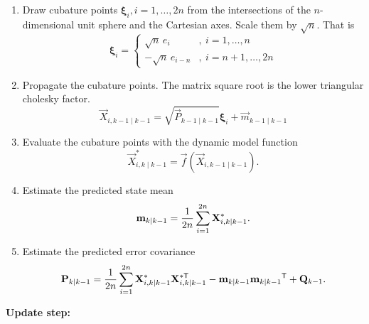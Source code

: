 \begin{enumerate}

  \item Draw cubature points $\boldsymbol{\xi}_i, i=1,\ldots,2n$ from the intersections of the $n$-dimensional unit sphere and the Cartesian axes. Scale them by $\sqrt{n}$. That is
%
    $$ \boldsymbol{\xi}_i =
	\begin{cases} 
	    \sqrt{n} \, e_i      & ,\: i = 1,\ldots,n \\
	    -\sqrt{n} \, e_{i-n} & ,\: i = n+1,\ldots,2n
	\end{cases}
 $$

  \item Propagate the cubature points. The matrix square root is the lower triangular cholesky factor.%
%
    $$ \vec{X}_{i,k-1 \mid k-1} = \sqrt{\vec{P}_{k-1 \mid k-1}} \boldsymbol{\xi}_i + \vec{m}_{k-1 \mid k-1}$$

  \item Evaluate the cubature points with the dynamic model function%
%
    $$ \vec{X}_{i,k \mid k-1}^* = \vec{f}(\vec{X}_{i,k-1 \mid k-1}). $$

  \item Estimate the predicted state mean%
%
    $$ \vec{m}_{k \mid k-1}  = {1 \over 2 n} \sum_{i=1}^{2 n} \vec{X}_{i,k \mid k-1}^*. $$

  \item Estimate the predicted error covariance%
%
    $$ \vec{P}_{k \mid k-1} = {1 \over 2 n} \sum_{i=1}^{2 n} \vec{X}_{i,k \mid k-1}^* \vec{X}_{i,k \mid k-1}^{*\mathsf{T}} - \vec{m}_{k \mid k-1} \vec{m}_{k \mid k-1}\T + \vec{Q}_{k-1}.$$ 

\end{enumerate}


\noindent
\textbf{Update step:}

